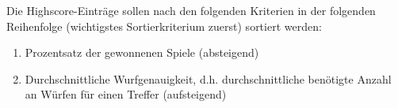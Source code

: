 Die Highscore-Eintr\"age sollen nach den folgenden Kriterien in der folgenden
Reihenfolge (wichtigstes Sortierkriterium zuerst) sortiert werden: 

\begin{enumerate}
\item Prozentsatz der gewonnenen Spiele (absteigend)
\item Durchschnittliche Wurfgenauigkeit,  d.h. durchschnittliche benötigte Anzahl an Würfen für einen Treffer (aufsteigend)
\end{enumerate}
